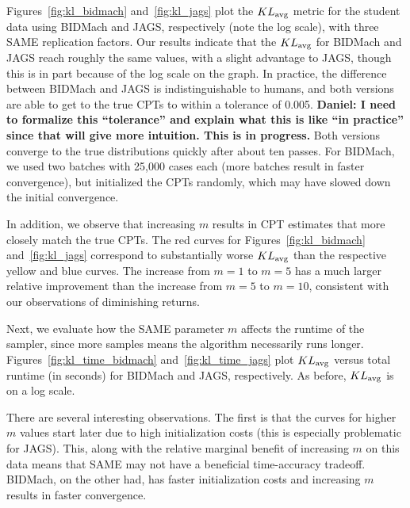 \documentclass{article} %
\begin{document}
Figures~\ref{fig:kl_bidmach} and~\ref{fig:kl_jags} plot the $KL_{\rm avg}$ metric for the student
data using BIDMach and JAGS, respectively (note the log scale), with three SAME replication factors.
Our results indicate that the $KL_{\rm avg}$ for BIDMach and JAGS reach roughly the same values,
with a slight advantage to JAGS, though this is in part because of the log scale on the graph. In
practice, the difference between BIDMach and JAGS is indistinguishable to humans, and both versions
are able to get to the true CPTs to within a tolerance of 0.005.  \textbf{Daniel: I need to
formalize this ``tolerance'' and explain what this is like ``in practice'' since that will give more
intuition.  This is in progress.} Both versions converge to the true distributions quickly after
about ten passes. For BIDMach, we used two batches with 25,000 cases each (more batches result in
faster convergence), but initialized the CPTs randomly, which may have slowed down the initial
convergence.

In addition, we observe that increasing $m$ results in CPT estimates that more closely match the
true CPTs. The red curves for Figures~\ref{fig:kl_bidmach} and~\ref{fig:kl_jags} correspond to
substantially worse $KL_{\rm avg}$ than the respective yellow and blue curves. The increase from
$m=1$ to $m=5$ has a much larger relative improvement than the increase from $m=5$ to $m=10$,
consistent with our observations of diminishing returns.

Next, we evaluate how the SAME parameter $m$ affects the runtime of the sampler, since more samples
means the algorithm necessarily runs longer. Figures~\ref{fig:kl_time_bidmach}
and~\ref{fig:kl_time_jags} plot $KL_{\rm avg}$ versus total runtime (in seconds) for BIDMach and
JAGS, respectively. As before, $KL_{\rm avg}$ is on a log scale.

There are several interesting observations. The first is that the curves for higher $m$ values start
later due to high initialization costs (this is especially problematic for JAGS). This, along with
the relative marginal benefit of increasing $m$ on this data means that SAME may not have a
beneficial time-accuracy tradeoff. BIDMach, on the other had, has faster initialization costs and
increasing $m$ results in faster convergence.

\end{document}
